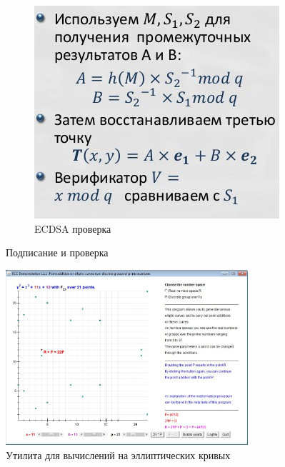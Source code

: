 \documentclass[a4paper, 14pt]{extarticle}
\begin{document}
\begin{enumerate}
\begin{figure}[h]
\begin{subfigure}[b]{0.45\textwidth}
        	\includegraphics[width=\textwidth]{img/S012.jpg}
        	\caption{ECDSA проверка}
        \end{subfigure}
        \caption{Подписание и проверка}
    \end{figure}

    \begin{figure}[h]
        \centering
        \includegraphics[width=0.8\textwidth]{img/S010.jpg}
        \caption{Утилита для вычислений на эллиптических кривых}%
        \label{img:3:3}
    \end{figure}
    \FloatBarrier{}


\end{enumerate}
\end{document}
